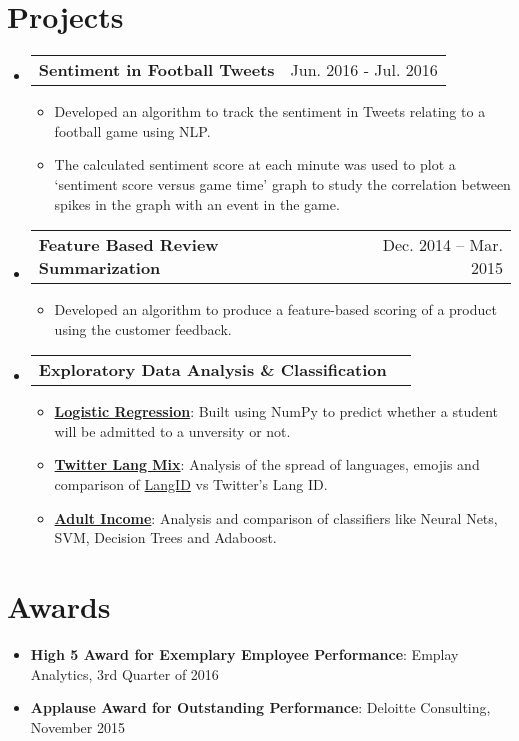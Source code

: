 \documentclass[letterpaper,11pt]{article}
\makeatletter
\newcommand{\resumeItem}[2]{
  \item\small{
    \textbf{#1}{: #2 \vspace{-2pt}}
  }
}
\newcommand{\resumeItemLink}[3]{
  \item\small{
    \textbf{\href{#1}{\small #2}}{: #3 \vspace{-2pt}}
  }
}
\newcommand{\projectSubheading}[2]{
  \vspace{-1pt}\item
    \begin{tabular*}{0.97\textwidth}{l@{\extracolsep{\fill}}r}
      \textbf{#1} & #2 \\
    \end{tabular*}\vspace{-5pt}
}
\newcommand{\resumeSubItem}[2]{\resumeItem{#1}{#2}\vspace{-4pt}}
\newcommand{\resumeSubHeadingListStart}{\begin{itemize}[leftmargin=*]}
\newcommand{\resumeSubHeadingListEnd}{\end{itemize}}
\newcommand{\resumeItemListStart}{\begin{itemize}}
\newcommand{\resumeItemListEnd}{\end{itemize}\vspace{-5pt}}
\makeatother
\begin{document}
\section{Projects}

	\resumeSubHeadingListStart

		\projectSubheading
 		{Sentiment in Football Tweets}{Jun. 2016 - Jul. 2016}
			\resumeItemListStart
				\item
				{Developed an algorithm to track the sentiment in Tweets relating to a football game using NLP.}
				\item
				{The calculated sentiment score at each minute was used to plot a ‘sentiment score versus game time’ graph to study the correlation between spikes in the graph with an event in the game.}
		      \resumeItemListEnd
 	
		\projectSubheading
 		{Feature Based Review Summarization}{ Dec. 2014 – Mar. 2015}
			\resumeItemListStart
				\item
				{Developed an algorithm to produce a feature-based scoring of a product using the customer feedback.}
		      \resumeItemListEnd

		\projectSubheading
 		{Exploratory Data Analysis \& Classification }{}
			\resumeItemListStart
				\resumeItemLink{https://github.com/saravrajavelu/LogisticRegression}{Logistic Regression}
    				 {Built using NumPy to predict whether a student will be admitted to a unversity or not.}
				\resumeItemLink{https://github.com/saravrajavelu/TwitterLanguageMix}{Twitter Lang Mix}
    				 {Analysis of the spread of languages, emojis and comparison of \href{https://github.com/saffsd/langid.py}{LangID} vs Twitter's Lang ID.}
				\resumeItemLink{https://github.com/saravrajavelu/Adult-Income-Analysis}{Adult Income}
    				 {Analysis and comparison of classifiers like Neural Nets, SVM, Decision Trees and Adaboost.}
		      \resumeItemListEnd

	\resumeSubHeadingListEnd



\section{Awards}
  \resumeSubHeadingListStart
    \resumeSubItem{High 5 Award for Exemplary Employee Performance}{Emplay Analytics, 3rd Quarter of 2016}
    \resumeSubItem{Applause Award for Outstanding Performance}{Deloitte Consulting, November 2015}
  \resumeSubHeadingListEnd


\end{document}

